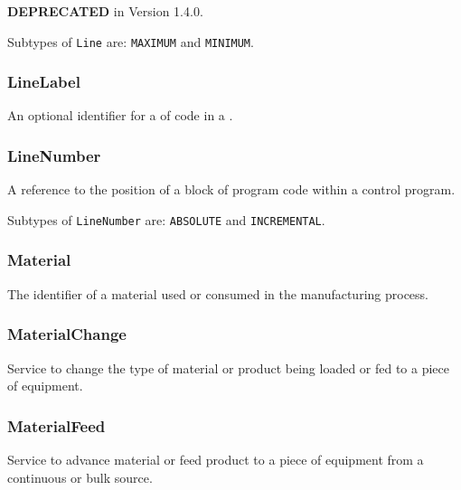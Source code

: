 \textbf{DEPRECATED} in Version 1.4.0.


Subtypes of \texttt{Line} are: \texttt{MAXIMUM} and \texttt{MINIMUM}. 
\FloatBarrier

\subsubsection{LineLabel}
  \label{sec:LineLabel}



An optional identifier for a  of code in a .

\FloatBarrier

\subsubsection{LineNumber}
  \label{sec:LineNumber}



A reference to the position of a block of program code within a control program.


Subtypes of \texttt{LineNumber} are: \texttt{ABSOLUTE} and \texttt{INCREMENTAL}. 
\FloatBarrier

\subsubsection{Material}
  \label{sec:Material}



The identifier of a material used or consumed in the manufacturing process.

\FloatBarrier

\subsubsection{MaterialChange}
  \label{sec:MaterialChange}



Service to change the type of material or product being loaded or fed to a piece of equipment.

\FloatBarrier

\subsubsection{MaterialFeed}
  \label{sec:MaterialFeed}



Service to advance material or feed product to a piece of equipment from a continuous or bulk source.

